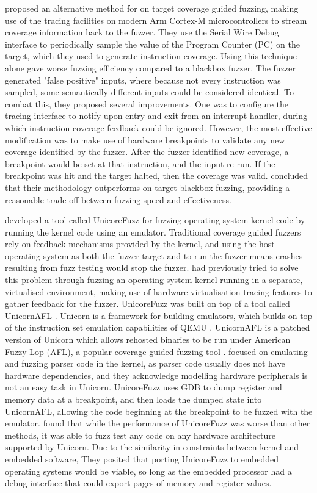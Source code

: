 \documentclass[../report.tex]{subfiles}
\begin{document}
\citet{Beckmann_2023} proposed an alternative method for on target coverage
guided fuzzing, making use of the tracing facilities on modern Arm Cortex-M
microcontrollers to stream coverage information back to the fuzzer. They use
the Serial Wire Debug interface to periodically sample the value of the Program
Counter (PC) on the target, which they used to generate instruction coverage.
Using this technique alone gave worse fuzzing efficiency compared to a blackbox
fuzzer. The fuzzer generated "false positive" inputs, where because not every
instruction was sampled, some semantically different inputs could be
considered identical. To combat this, they proposed several improvements. One
was to configure the tracing interface to notify upon entry and exit from an
interrupt handler, during which instruction coverage feedback could be ignored.
However, the most effective modification was to make use of hardware
breakpoints to validate any new coverage identified by the fuzzer. After the
fuzzer identified new coverage, a breakpoint would be set at that instruction,
and the input re-run. If the breakpoint was hit and the target halted, then the
coverage was valid. \citet{Beckmann_2023} concluded that their methodology
outperforms on target blackbox fuzzing, providing a reasonable trade-off
between fuzzing speed and effectiveness.

\citet{Maier_2019} developed a tool called UnicoreFuzz for fuzzing operating
system kernel code by running the kernel code using an emulator. Traditional
coverage guided fuzzers rely on feedback mechanisms provided by the kernel, and
using the host operating system as both the fuzzer target and to run the fuzzer
means crashes resulting from fuzz testing would stop the fuzzer.
\citet{kAFL_2017} had previously tried to solve this problem through fuzzing an
operating system kernel running in a separate, virtualised environment, making
use of hardware virtualisation tracing features to gather feedback for the
fuzzer. UnicoreFuzz was built on top of a tool called UnicornAFL
\citep{Maier_2019}. Unicorn is a framework for building emulators, which builds
on top of the instruction set emulation capabilities of QEMU \citep{Unicorn}.
UnicornAFL is a patched version of Unicorn which allows rehosted binaries to be
run under American Fuzzy Lop (AFL), a popular coverage guided fuzzing tool
\citep{UnicornMode, AFL_2019}.
\citet{Maier_2019} focused on emulating and fuzzing parser code in the kernel,
as parser code usually does not have hardware dependencies, and they
acknowledge modelling hardware peripherals is not an easy task in Unicorn.
UnicoreFuzz uses GDB to dump register and memory data at a breakpoint, and then
loads the dumped state into UnicornAFL, allowing the code beginning at the
breakpoint to be fuzzed with the emulator. \citet{Maier_2019} found that while
the performance of UnicoreFuzz was worse than other methods, it was able to
fuzz test any code on any hardware architecture supported by Unicorn. Due to
the similarity in constraints between kernel and embedded software, They
posited that porting UnicoreFuzz to embedded operating systems would be viable,
so long as the embedded processor had a debug interface that could export pages
of memory and register values.
\end{document}
